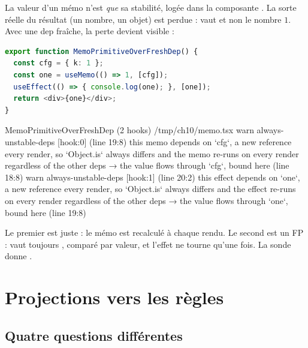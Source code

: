 \begin{piege}
  La valeur d'un mémo n'est \emph{que} sa stabilité, logée dans la
  composante . La sorte réelle du résultat (un nombre, un
  objet) est perdue :  vaut  et
  non le nombre $1$. Avec une dep fraîche, la perte devient visible :
\begin{lstlisting}[language=TypeScript,caption={Un mémo primitif sur une dep fraîche (\file{/tmp/ch10/memo.tsx}, extrait)},label={lst:statevalue-stabilite-memoprim}]
export function MemoPrimitiveOverFreshDep() {
  const cfg = { k: 1 };
  const one = useMemo(() => 1, [cfg]);
  useEffect(() => { console.log(one); }, [one]);
  return <div>{one}</div>;
}
\end{lstlisting}
\begin{sortie}
  MemoPrimitiveOverFreshDep  (2 hooks)  /tmp/ch10/memo.tsx
    warn   always-unstable-deps  [hook:0]  (line 19:8)  this memo depends on `cfg`, a new reference every render, so `Object.is` always differs and the memo re-runs on every render regardless of the other deps
       → the value flows through `cfg`, bound here (line 18:8)
    warn   always-unstable-deps  [hook:1]  (line 20:2)  this effect depends on `one`, a new reference every render, so `Object.is` always differs and the effect re-runs on every render regardless of the other deps
       → the value flows through `one`, bound here (line 19:8)
\end{sortie}
  Le premier \Warning{} est juste : le mémo est recalculé à chaque rendu.
  Le second est un FP :  vaut toujours , comparé par
  valeur, et l'effet ne tourne qu'une fois. La sonde donne
  .
\end{piege}

\section{Projections vers les règles}
\label{sec:statevalue-stabilite-projections}

\subsection{Quatre questions différentes}

